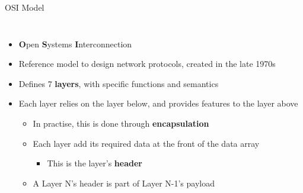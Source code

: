 \begin{frame}{OSI Model}
\begin{columns}
	\begin{itemize}
		\item \textbf{O}pen \textbf{S}ystems \textbf{I}nterconnection
		\item Reference model to design network protocols, created in the late 1970s
		\item Defines 7 \textbf{layers}, with specific functions and semantics
		\item Each layer relies on the layer below, and provides features to the layer above
			\begin{itemize}
				\item In practise, this is done through \textbf{encapsulation}
				\item Each layer add its required data at the front of the data array
					\begin{itemize}
						\item This is the layer's \textbf{header}
					\end{itemize}
				\item A Layer N's header is part of Layer N-1's payload
			\end{itemize}
	\end{itemize}
	\end{columns}
\end{frame}

